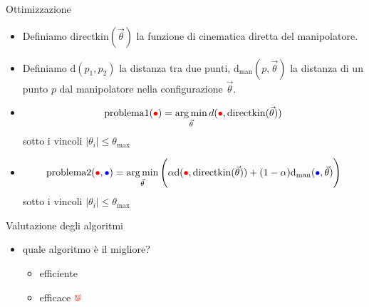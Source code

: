 









\begin{frame}{Ottimizzazione}

    \begin{itemize}
        \item<1->[] Definiamo $\mathrm{directkin}(\vec{\theta})$ la funzione di cinematica diretta del manipolatore.
        \item<2->[] Definiamo $\mathrm{d}(p_1, p_2)$ la distanza tra due punti, $\mathrm{d}_\text{man}(p, \vec{\theta})$ la distanza di un punto $p$ dal manipolatore nella configurazione $\vec{\theta}$.
        \item<3->[] \[ \text{problema1}(\textcolor{red}{\bullet}) = \operatorname*{arg\,min}\limits_{\vec{\theta}} d(\textcolor{red}{\bullet}, \mathrm{directkin}(\vec{\theta})) \]
        sotto i vincoli $|\theta_i| \le \theta_\text{max}$
        \item<4->[] \[ \text{problema2}(\textcolor{red}{\bullet}, \textcolor{blue}{\bullet}) = \operatorname*{arg\,min}\limits_{\vec{\theta}} \Bigg( \alpha \mathrm{d}(\textcolor{red}{\bullet}, \mathrm{directkin}(\vec{\theta})) + (1-\alpha) \mathrm{d}_\text{man}(\textcolor{blue}{\bullet}, \vec{\theta}) \Bigg)\]
        sotto i vincoli $|\theta_i| \le \theta_\text{max}$
    \end{itemize}
    

\end{frame}

\begin{frame}{Valutazione degli algoritmi}
\begin{itemize}
\item<1-> quale algoritmo è il migliore?
    \begin{itemize}
        \item<2-> efficiente \Interval
        \item<3-> efficace \includegraphics[width=10px]{slide/img_cinematica_inversa/hundred_point_emoji.png}
    \end{itemize}
\end{itemize}
\end{frame}

